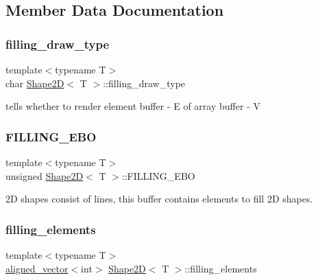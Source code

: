 \subsection{Member Data Documentation}
\mbox{\label{classShape2D_ab24ceddaa0114eda3ae699f8fb3503ca}} 
\subsubsection{\texorpdfstring{filling\+\_\+draw\+\_\+type}{filling\_draw\_type}}
{\footnotesize\ttfamily template$<$typename T$>$ \\
char \mbox{\hyperlink{classShape2D}{Shape2D}}$<$ T $>$\+::filling\+\_\+draw\+\_\+type\hspace{0.3cm}{\ttfamily [protected]}}

tells whether to render element buffer -\/ \textquotesingle{}E\textquotesingle{} of array buffer -\/ \textquotesingle{}V\textquotesingle{} \mbox{\label{classShape2D_affa1082cd6e91cce5af4cb10c1b3435f}} 
\subsubsection{\texorpdfstring{F\+I\+L\+L\+I\+N\+G\+\_\+\+E\+BO}{FILLING\_EBO}}
{\footnotesize\ttfamily template$<$typename T$>$ \\
unsigned \mbox{\hyperlink{classShape2D}{Shape2D}}$<$ T $>$\+::F\+I\+L\+L\+I\+N\+G\+\_\+\+E\+BO\hspace{0.3cm}{\ttfamily [protected]}}

2D shapes consist of lines, this buffer contains elements to fill 2D shapes. \mbox{\label{classShape2D_a28d0d6018cb6b73637050d9f3fb1f006}} 
\subsubsection{\texorpdfstring{filling\+\_\+elements}{filling\_elements}}
{\footnotesize\ttfamily template$<$typename T$>$ \\
\mbox{\hyperlink{type__definitions_8hpp_a087efd587d66b881646ef378f1919c90}{aligned\+\_\+vector}}$<$int$>$ \mbox{\hyperlink{classShape2D}{Shape2D}}$<$ T $>$\+::filling\+\_\+elements\hspace{0.3cm}{\ttfamily [protected]}}

